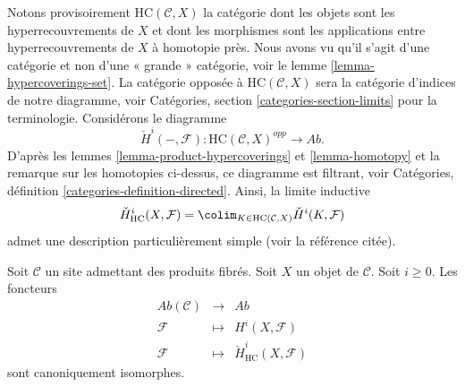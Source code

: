 \medskip\noindent
Notons provisoirement $\text{HC}(\mathcal{C}, X)$
la catégorie dont les objets sont les hyperrecouvrements de $X$
et dont les morphismes sont les applications entre hyperrecouvrements de $X$
à homotopie près. Nous avons vu qu'il
s'agit d'une catégorie et non d'une « grande » catégorie,
voir le lemme \ref{lemma-hypercoverings-set}.
La catégorie opposée à $\text{HC}(\mathcal{C}, X)$
sera la catégorie d'indices de notre diagramme, voir
Catégories, section \ref{categories-section-limits} pour la terminologie.
Considérons le diagramme
$$
\check{H}^i(-, \mathcal{F}) :
\text{HC}(\mathcal{C}, X)^{opp}
\longrightarrow
\textit{Ab}.
$$
D'après les lemmes \ref{lemma-product-hypercoverings} et \ref{lemma-homotopy}
et la remarque sur les homotopies ci-dessus, ce diagramme est filtrant, voir
Catégories, définition \ref{categories-definition-directed}.
Ainsi, la limite inductive
$$
\check{H}^i_{\text{HC}}(X, \mathcal{F}) =
\colim_{K \in \text{HC}(\mathcal{C}, X)} \check{H}^i(K, \mathcal{F})
$$
admet une description particulièrement simple (voir la référence citée).

\begin{theorem}
\label{theorem-cohomology-hypercoverings}
Soit $\mathcal{C}$ un site admettant des produits fibrés.
Soit $X$ un objet de $\mathcal{C}$. Soit $i \geq 0$.
Les foncteurs
\begin{eqnarray*}
\textit{Ab}(\mathcal{C}) & \longrightarrow & \textit{Ab} \\
\mathcal{F} & \longmapsto & H^i(X, \mathcal{F}) \\
\mathcal{F} & \longmapsto & \check{H}^i_{\text{HC}}(X, \mathcal{F})
\end{eqnarray*}
sont canoniquement isomorphes.
\end{theorem}

